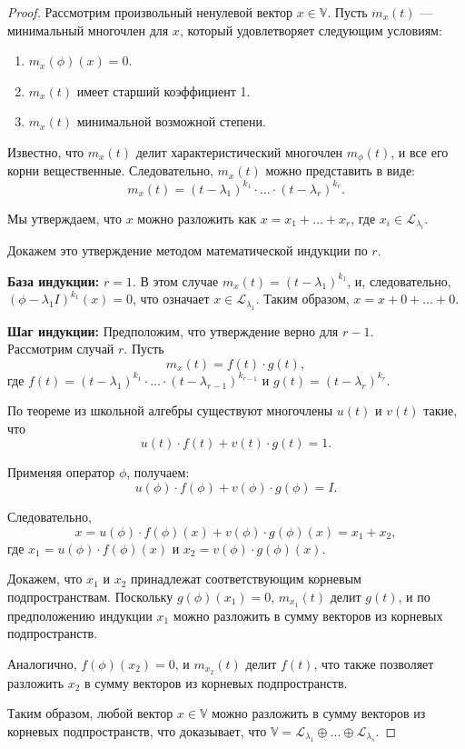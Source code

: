 \begin{proof}
\leavevmode \nl 

    Рассмотрим произвольный ненулевой вектор $x \in \mathbb{V}$. Пусть $m_{x}(t)$ — минимальный многочлен для $x$, который удовлетворяет следующим условиям:
    \begin{enumerate}
        \item $m_{x}(\phi)(x) = 0$.
        \item $m_{x}(t)$ имеет старший коэффициент 1.
        \item $m_{x}(t)$ минимальной возможной степени.
    \end{enumerate}
    Известно, что $m_{x}(t)$ делит характеристический многочлен $m_{\phi}(t)$, и все его корни вещественные. Следовательно, $m_{x}(t)$ можно представить в виде:
    \[
    m_{x}(t) = (t - \lambda_{1})^{k_1} \cdot \ldots \cdot (t - \lambda_{r})^{k_{r}}.
    \]

    Мы утверждаем, что $x$ можно разложить как $x = x_{1} + \ldots + x_{r}$, где $x_{i} \in \mathcal{L}_{\lambda_{i}}$. 
    
Докажем это утверждение методом математической индукции по $r$.

    \textbf{База индукции:} $r = 1$. В этом случае $m_{x}(t) = (t - \lambda_{1})^{k_{1}}$, и, следовательно, \\$(\phi - \lambda_{1} I)^{k_{1}}(x) = 0$, что означает $x \in \mathcal{L}_{\lambda_{1}}$. Таким образом, $x = x + 0 + \ldots + 0$.

    \textbf{Шаг индукции:} Предположим, что утверждение верно для $r-1$. \\ Рассмотрим случай $r$. Пусть
    \[
    m_{x}(t) = f(t) \cdot g(t),
    \]
    где $f(t) = (t - \lambda_{1})^{k_{1}} \cdot \ldots \cdot (t - \lambda_{r-1})^{k_{r-1}}$ и $g(t) = (t - \lambda_{r})^{k_{r}}$. 
    
    По теореме из школьной алгебры существуют многочлены $u(t)$ и $v(t)$ такие, что
    \[
    u(t) \cdot f(t) + v(t) \cdot g(t) = 1.
    \]

    Применяя оператор $\phi$, получаем:
    \[
    u(\phi) \cdot f(\phi) + v(\phi) \cdot g(\phi) = I.
    \]

    Следовательно,
    \[
    x = u(\phi) \cdot f(\phi)(x) + v(\phi) \cdot g(\phi)(x) = x_{1} + x_{2},
    \]
    где $x_{1} = u(\phi) \cdot f(\phi)(x)$ и $x_{2} = v(\phi) \cdot g(\phi)(x)$.


    Докажем, что $x_{1}$ и $x_{2}$ принадлежат соответствующим корневым \\подпространствам. Поскольку $g(\phi)(x_{1}) = 0$, $m_{x_{1}}(t)$ делит $g(t)$, и по предположению индукции $x_{1}$ можно разложить в сумму векторов из корневых подпространств. 
    
    Аналогично, $f(\phi)(x_{2}) = 0$, и $m_{x_{2}}(t)$ делит $f(t)$, что также позволяет разложить $x_{2}$ в сумму векторов из корневых подпространств.

    Таким образом, любой вектор $x \in \mathbb{V}$ можно разложить в сумму векторов из корневых подпространств, что доказывает, что $\mathbb{V} = \mathcal{L}_{\lambda_{1}} \oplus \ldots \oplus \mathcal{L}_{\lambda_{s}}$.
\end{proof}

